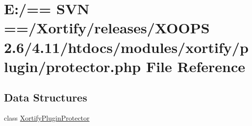 \hypertarget{protector_8php}{\section{E\-:/== S\-V\-N ==/\-Xortify/releases/\-X\-O\-O\-P\-S 2.6/4.11/htdocs/modules/xortify/plugin/protector.php File Reference}
\label{protector_8php}
}
\subsection*{Data Structures}
\begin{DoxyCompactItemize}
\item 
class \hyperlink{class_xortify_plugin_protector}{Xortify\-Plugin\-Protector}
\end{DoxyCompactItemize}

